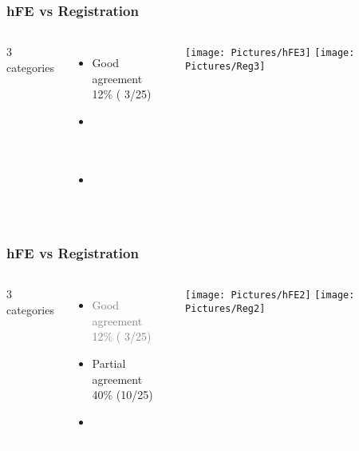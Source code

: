 \documentclass[xcolor=table,11pt]{beamer}
\begin{document}
	\begin{frame}
		\frametitle{hFE vs Registration}
		\centering
		\vfill
		\begin{columns}
			\vfill
			3 categories\\
			\vspace{2mm}
			\begin{itemize}
				\item Good agreement\\12\% ( 3/25)
				\item \textcolor{white}{Partial agreement\\40\% (10/25)}
				\item \textcolor{white}{Bad agreement\\48\% (12/25)}
			\end{itemize}
			\vfill

			\centering
			\texttt{[image: Pictures/hFE3]}\vspace{5mm}
			\texttt{[image: Pictures/Reg3]}
		\end{columns}
	\end{frame}

	\begin{frame}[noframenumbering]
		\frametitle{hFE vs Registration}
		\centering
		\vspace{2mm}
		\begin{columns}
			\column{0.33\linewidth}
			\vfill
			3 categories\\
			\vfill
			\begin{itemize}
				\item \textcolor{gray}{Good agreement\\12\% ( 3/25)}
				\item Partial agreement\\40\% (10/25)
				\item \textcolor{white}{Bad agreement\\48\% (12/25)}
			\end{itemize}
			\vfill

			\column{0.4\linewidth}
			\centering
			\texttt{[image: Pictures/hFE2]}\vspace{5mm}
			\texttt{[image: Pictures/Reg2]}
		\end{columns}
	\end{frame}
\end{document}
